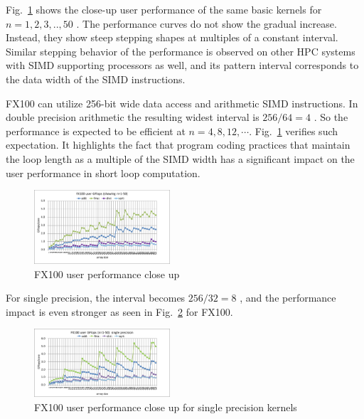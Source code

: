 \documentclass[conference]{IEEEtran}
\begin{document}
Fig.~\ref{fig:fx100-gflops-short-R8}
shows the close-up user performance of the same basic kernels for
\begin{math}
n=1,2,3,..,50
\end{math}
.
%
The performance curves do not show the gradual increase. Instead, they
show steep stepping shapes at multiples of a constant interval.
Similar stepping behavior of the performance
is observed on other HPC systems with SIMD supporting processors as well,
and its pattern interval corresponds to the data width of the SIMD instructions.

FX100 can utilize 256-bit wide data access and arithmetic SIMD instructions.
In double precision arithmetic the resulting widest interval is
\begin{math}
256 / 64 = 4
\end{math}
.
So the performance is expected to be efficient at $ n=4,8,12,\cdots $.
Fig.~\ref{fig:fx100-gflops-short-R8} verifies such expectation.
It highlights the fact that
program coding practices that maintain the loop length as a multiple of
the SIMD width has a significant impact on the user performance
in short loop computation.
\begin{figure}[tb]
\centering
\includegraphics[width=0.45\textwidth]{figs/fx100-gflops-short-R8.pdf}
\caption{FX100 user performance close up}
\label{fig:fx100-gflops-short-R8}
\end{figure}

For single precision, the interval becomes
\begin{math}
256 / 32 = 8
\end{math}
, and the performance impact is even stronger as seen in
Fig.~\ref{fig:fx100-gflops-short-R4} for FX100.
\begin{figure}[tb]
\centering
\includegraphics[width=0.45\textwidth]{figs/fx100-gflops-short-R4.pdf}
\caption{FX100 user performance close up for single precision kernels}
\label{fig:fx100-gflops-short-R4}
\end{figure}
\end{document}
